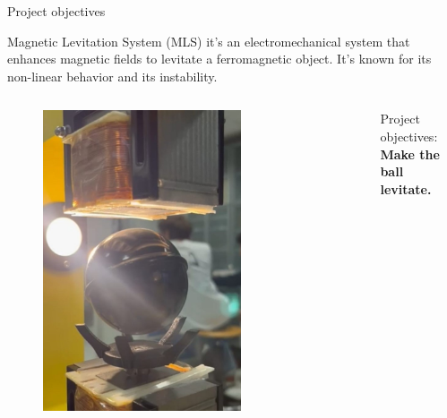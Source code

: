 \begin{frame}{Project objectives}

    Magnetic Levitation System (MLS) it's an electromechanical system that enhances magnetic fields to levitate a ferromagnetic object.
    It's known for its non-linear behavior and its instability.

    \begin{columns}[c, onlytextwidth]

        \begin{column}{0.5\textwidth}

            \begin{figure}[H]
                \centering
                \includegraphics[width=0.7\textwidth]{img/ball_levitation.jpg}
            \end{figure}

        \end{column}

        \begin{column}{0.5\textwidth}

            \begin{center}
                Project objectives: \\
                \textbf{Make the ball levitate.}
            \end{center}

        \end{column}

    \end{columns}



\end{frame}